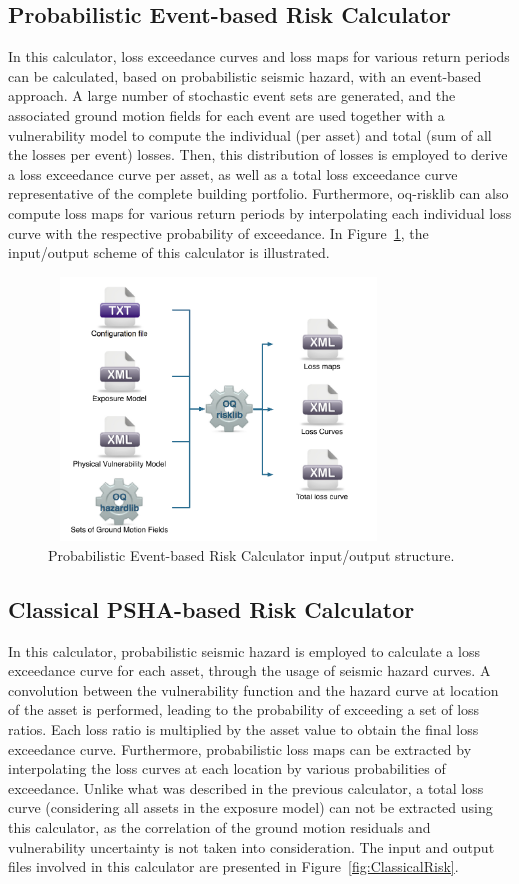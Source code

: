 \subsection{Probabilistic Event-based Risk Calculator}
In this calculator, loss exceedance curves and loss maps for various return periods can be calculated, based on probabilistic seismic hazard, with an event-based approach. A large number of stochastic event sets are generated, and the associated ground motion fields for each event are used together with a vulnerability model to compute the individual (per asset) and total (sum of all the losses per event) losses. Then, this distribution of losses is employed to derive a loss exceedance curve per asset, as well as a total loss exceedance curve representative of the complete building portfolio. Furthermore, oq-risklib can also compute loss maps for various return periods by interpolating each individual loss curve with the respective probability of exceedance. In Figure~\ref{fig:ProbEvent}, the input/output scheme of this calculator is illustrated.

\begin{figure}[ht]
\centering
\includegraphics[width=9cm,height=7cm]{figures/risk/ProbEvent.pdf}
\caption{Probabilistic Event-based Risk Calculator input/output structure.}
\label{fig:ProbEvent}
\end{figure}

\subsection{Classical PSHA-based Risk Calculator}
In this calculator, probabilistic seismic hazard is employed to calculate a loss exceedance curve for each asset, through the usage of seismic hazard curves. A convolution between the vulnerability function and the hazard curve at location of the asset is performed, leading to the probability of exceeding a set of loss ratios. Each loss ratio is multiplied by the asset value to obtain the final loss exceedance curve. Furthermore, probabilistic loss maps can be extracted by interpolating the loss curves at each location by various probabilities of exceedance. Unlike what was described in the previous calculator, a total loss curve (considering all assets in the exposure model) can not be extracted using this calculator, as the correlation of the ground motion residuals and vulnerability uncertainty is not taken into consideration. The input and output files involved in this calculator are presented in Figure~\ref{fig:ClassicalRisk}.

